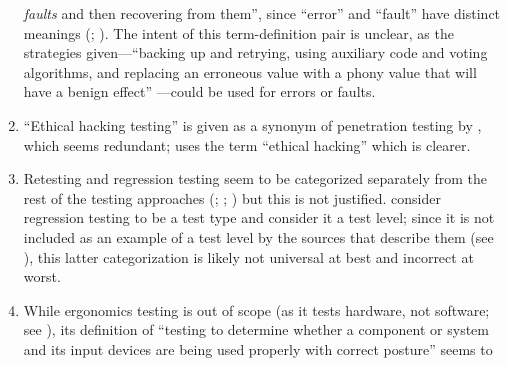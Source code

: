 \begin{enumerate}
          \emph{faults} and then recovering from them'', since ``error'' and
          ``fault'' have distinct meanings (\citealp[p.~5\=/3]{SWEBOK2024};
          \citealp[pp.~399\==400]{vanVliet2000}). The intent of this
          term-definition pair is unclear, as the strategies given---``backing
          up and retrying, using auxiliary code and voting algorithms, and
          replacing an erroneous value with a phony value that will have a
          benign effect'' \citep[p.~4\=/11]{SWEBOK2024}---could be used for
          errors or faults.
    \item %
          ``Ethical hacking testing'' is given as a synonym of penetration
          testing by \citet[p.~13\=/4]{SWEBOK2024}, which seems redundant;
          \citet[p.~28]{Gerrard2000b} uses the term ``ethical hacking'' which
          is clearer.
    \item %
          Retesting and regression testing seem to be categorized separately
          from the rest of the testing approaches (\citealp[pp.~15, 23]{IEEE2022};
          \citeyear[p.~8]{IEEE2021a}; \citeyear[p.~4]{IEEE2021b}) but this is
          not justified. \citetISTQB{} consider regression testing to be a test
          type and \citet[p.~3]{BarbosaEtAl2006} consider it a test level;
          since it is not included as an example of a test level by the sources
          that describe them (see ), this latter categorization
          is likely not universal at best and incorrect at worst.
    \item %
          While ergonomics testing is out of scope (as it tests hardware, not
          software; see ), its definition of ``testing to
          determine whether a component or system and its input devices are
          being used properly with correct posture'' \citepISTQB{} seems to

\end{enumerate}
